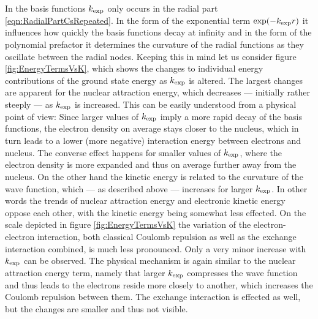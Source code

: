 In the \CS basis functions
$k_\text{exp}$ only occurs in the radial part \eqref{eqn:RadialPartCsRepeated}.
In the form of the exponential term $\exp(-k_\text{exp} r)$
it influences how quickly the basis functions decay at infinity
and in the form of the polynomial prefactor it determines
the curvature of the radial functions as they oscillate between the radial nodes.
Keeping this in mind let us consider figure \vref{fig:EnergyTermsVsK},
which shows the changes to individual energy contributions
of the \HF ground state energy as $k_\text{exp}$ is altered.
The largest changes are apparent for the nuclear attraction energy,
which decreases --- initially rather steeply --- as $k_\text{exp}$ is increased.
This can be easily understood from a physical point of view:
Since larger values of $k_\text{exp}$ imply a more rapid decay
of the basis functions,
the electron density on average stays closer to the nucleus,
which in turn leads to a lower (more negative) interaction energy
between electrons and nucleus.
The converse effect happens for smaller values of $k_\text{exp}$,
where the electron density is more expanded
and thus on average further away from the nucleus.
On the other hand the kinetic energy is related to the curvature of the wave function,
which --- as described above --- increases for larger $k_\text{exp}$.
In other words the trends of nuclear attraction energy and electronic kinetic energy
oppose each other,
with the kinetic energy being somewhat less effected.
On the scale depicted in figure \ref{fig:EnergyTermsVsK}
the variation of the electron-electron interaction,
\ie both classical Coulomb repulsion as well as the exchange interaction combined,
is much less pronounced.
Only a very minor increase with $k_\text{exp}$ can be observed.
The physical mechanism is again similar to the nuclear attraction
energy term,
namely that larger $k_\text{exp}$ compresses the wave function
and thus leads to the electrons reside more closely to another,
which increases the Coulomb repulsion between them.
The exchange interaction is effected as well,
but the changes are smaller and thus not visible.


